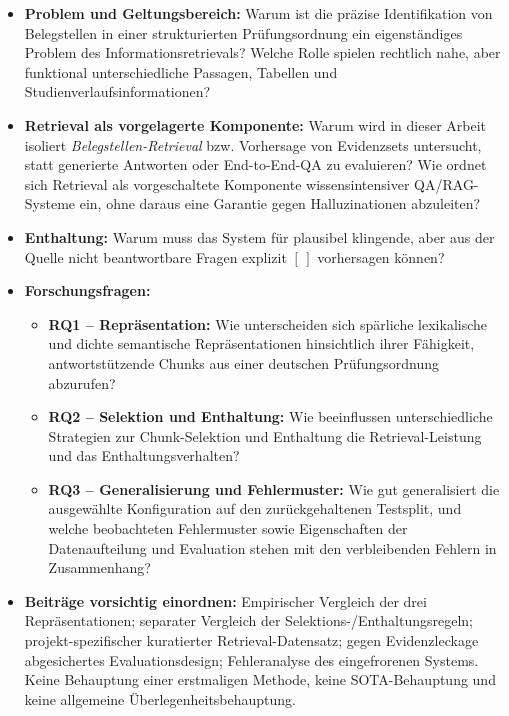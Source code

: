 \documentclass[11pt]{article}
\begin{document}
\begin{leitfragenbox}
\begin{itemize}
    \item \textbf{Problem und Geltungsbereich:} Warum ist die pr\"azise Identifikation von Belegstellen in einer strukturierten Pr\"ufungsordnung ein eigenständiges Problem des Informationsretrievals? Welche Rolle spielen rechtlich nahe, aber funktional unterschiedliche Passagen, Tabellen und Studienverlaufsinformationen?
    \item \textbf{Retrieval als vorgelagerte Komponente:} Warum wird in dieser Arbeit isoliert \textit{Belegstellen-Retrieval} bzw. Vorhersage von Evidenzsets untersucht, statt generierte Antworten oder End-to-End-QA zu evaluieren? Wie ordnet sich Retrieval als vorgeschaltete Komponente wissensintensiver QA/RAG-Systeme ein, ohne daraus eine Garantie gegen Halluzinationen abzuleiten?
    \item \textbf{Enthaltung:} Warum muss das System f\"ur plausibel klingende, aber aus der Quelle nicht beantwortbare Fragen explizit $[\,]$ vorhersagen k\"onnen?
    \item \textbf{Forschungsfragen:}
    \begin{itemize}
        \item \textbf{RQ1 -- Repräsentation:} Wie unterscheiden sich spärliche lexikalische und dichte semantische Repräsentationen hinsichtlich ihrer Fähigkeit, antwortstützende Chunks aus einer deutschen Prüfungsordnung abzurufen?
        \item \textbf{RQ2 -- Selektion und Enthaltung:} Wie beeinflussen unterschiedliche Strategien zur Chunk-Selektion und Enthaltung die Retrieval-Leistung und das Enthaltungsverhalten?
        \item \textbf{RQ3 -- Generalisierung und Fehlermuster:} Wie gut generalisiert die ausgewählte Konfiguration auf den zurückgehaltenen Testsplit, und welche beobachteten Fehlermuster sowie Eigenschaften der Datenaufteilung und Evaluation stehen mit den verbleibenden Fehlern in Zusammenhang?
    \end{itemize}
    \item \textbf{Beiträge vorsichtig einordnen:} Empirischer Vergleich der drei Repr\"asentationen; separater Vergleich der Selektions-/Enthaltungsregeln; projekt-spezifischer kuratierter Retrieval-Datensatz; gegen Evidenzleckage abgesichertes Evaluationsdesign; Fehleranalyse des eingefrorenen Systems. Keine Behauptung einer erstmaligen Methode, keine SOTA-Behauptung und keine allgemeine Überlegenheitsbehauptung.
\end{itemize}
\end{leitfragenbox}
\end{document}
